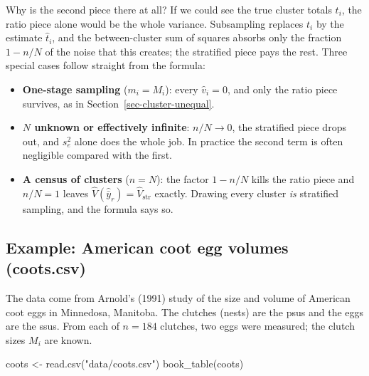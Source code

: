 \documentclass[
  letterpaper,
  DIV=11,
  numbers=noendperiod]{scrreprt}
\newenvironment{Shaded}{\begin{snugshade}}{\end{snugshade}}
\newcommand{\FunctionTok}[1]{\textcolor[rgb]{0.28,0.35,0.67}{#1}}
\newcommand{\NormalTok}[1]{\textcolor[rgb]{0.00,0.23,0.31}{#1}}
\newcommand{\OtherTok}[1]{\textcolor[rgb]{0.00,0.23,0.31}{#1}}
\newcommand{\StringTok}[1]{\textcolor[rgb]{0.13,0.47,0.30}{#1}}
\providecommand{\tightlist}{%
  \setlength{\itemsep}{0pt}\setlength{\parskip}{0pt}}
\renewcommand{\[}{\begin{equation}}
\renewcommand{\]}{\end{equation}}
\begin{document}
Why is the second piece there at all? If we could see the true cluster
totals \(t_i\), the ratio piece alone would be the whole variance.
Subsampling replaces \(t_i\) by the estimate \(\hat{t}_i\), and the
between-cluster sum of squares absorbs only the fraction \(1 - n/N\) of
the noise that this creates; the stratified piece pays the rest. Three
special cases follow straight from the formula:

\begin{itemize}
\tightlist
\item
  \textbf{One-stage sampling} (\(m_i = M_i\)): every \(\hat{v}_i = 0\),
  and only the ratio piece survives, as in
  Section~\ref{sec-cluster-unequal}.
\item
  \textbf{\(N\) unknown or effectively infinite}: \(n/N \to 0\), the
  stratified piece drops out, and \(s_e^2\) alone does the whole job. In
  practice the second term is often negligible compared with the first.
\item
  \textbf{A census of clusters} (\(n = N\)): the factor \(1 - n/N\)
  kills the ratio piece and \(n/N = 1\) leaves
  \(\hat{V}(\hat{\bar y}_r) = \hat{V}_{\mathrm{str}}\) exactly. Drawing
  every cluster \emph{is} stratified sampling, and the formula says so.
\end{itemize}

\subsection{Example: American coot egg volumes
(coots.csv)}\label{sec-cluster-coots}

The data come from Arnold's (1991) study of the size and volume of
American coot eggs in Minnedosa, Manitoba. The clutches (nests) are the
psus and the eggs are the ssus. From each of \(n = 184\) clutches, two
eggs were measured; the clutch sizes \(M_i\) are known.

\begin{Shaded}
\begin{Highlighting}[]
\NormalTok{coots }\OtherTok{\textless{}{-}} \FunctionTok{read.csv}\NormalTok{(}\StringTok{"data/coots.csv"}\NormalTok{)}
\FunctionTok{book\_table}\NormalTok{(coots)}
\end{Highlighting}
\end{Shaded}
\end{document}

